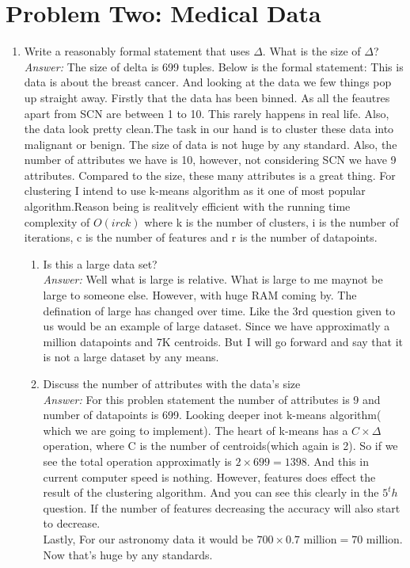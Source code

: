 \documentclass{article}
\begin{document}
\section*{Problem Two: Medical Data}
\begin{enumerate}
	\item Write a reasonably formal statement that uses $\Delta$. What is the size of $\Delta$?\\
	\emph{Answer:} The size of delta is 699 tuples. Below is the formal statement: 
	This is data is about the breast cancer. And looking at the data we few things pop up straight away. Firstly that the data has been binned. As all the feautres apart from SCN are between 1 to 10. This rarely happens in real life. Also, the data look pretty clean.The task in our hand is to cluster these data into malignant or benign. The size of data is not huge by any standard. Also, the number of attributes we have is 10, however, not considering SCN we have 9 attributes. Compared to the size, these many attributes is a great thing.  For clustering I intend to use k-means algorithm as it one of most popular algorithm.Reason being is realitvely efficient with the running time complexity of $O(irck)$ where k is the number of clusters, i is the number of iterations, c is the number of features and r is the number of datapoints. 
	\begin{enumerate}
		\item Is this a large data set?\\
		\emph{Answer:} Well what is large is relative. What is large to me maynot be large to someone else. However, with huge RAM coming by. The defination of large has changed over time. Like the 3rd question given to us would be an example of large dataset. Since we have approximatly a million datapoints and 7K centroids. But I will go forward and say that it is not a large dataset by any means.\\
		\item Discuss the number of attributes with the data’s size\\
		\emph{Answer:} For this problen statement the number of attributes is 9 and number of datapoints is 699. Looking deeper inot k-means algorithm( which we are going to implement). The heart of k-means has a $C \times \Delta$ operation, where C is the number of centroids(which again is 2). So if we see the total operation approximatly is $2\times 699 = 1398$. And this in current computer speed is nothing. However, features does effect the result of the clustering algorithm. And you can see this clearly in the $5^th$question. If the number of features decreasing the accuracy will also start to decrease. \\
Lastly, For our astronomy data it would be $700 \times 0.7 \text{ million}= 70 \text{ million}$. Now that's huge by any standards.


\end{enumerate}
\end{enumerate}
\end{document}
